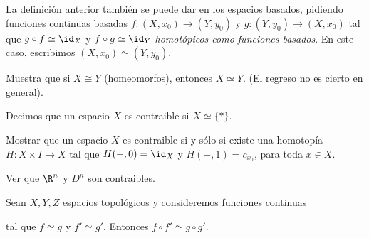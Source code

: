     La definición anterior también se puede dar en los espacios basados, pidiendo funciones continuas basadas $f:(X,x_0)\to (Y,y_0)$ y $g:(Y,y_0)\to (X,x_0)$ tal que $g\circ f\simeq \id_X$ y $f\circ g\simeq \id_Y$ \textit{homotópicos como funciones basados}. En este caso, escribimos $(X,x_0)\simeq (Y,y_0).$
    \begin{ejercicio}
        Muestra que si $X\cong Y$ (homeomorfos), entonces $X\simeq Y$. (El regreso no es cierto en general).
    \end{ejercicio}
    \begin{definicion}
        Decimos que un espacio $X$ es contraible si $X\simeq \{*\}$.
    \end{definicion}
    \begin{ejercicio}
        Mostrar que un espacio $X$ es contraible si y sólo si existe una homotopía $H:X\times I\to X$ tal que $H(-,0)=\id_X$ y $H(-,1)=c_{x_0}$, para toda $x\in X$.
    \end{ejercicio}
    \begin{ejercicio}
        Ver que $\R^n$ y $D^n$ son contraibles.
    \end{ejercicio}
    \begin{prop}
    \label{prop:homotopia_compatible_composicion}
        Sean $X,Y,Z$ espacios topológicos y consideremos funciones continuas
        \begin{center}
        \end{center}
        tal que $f\simeq g$ y $f'\simeq g'$. Entonces $f\circ f'\simeq g\circ g'$. 
    \end{prop}
